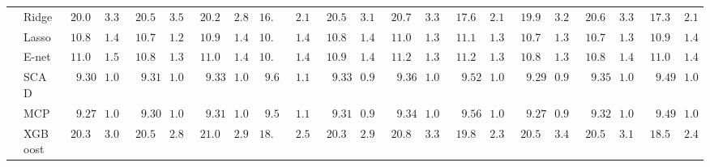 \begin{tabular}{p{0.2cm}p{1cm}|p{0.6cm}p{0.6cm}|p{0.6cm}p{0.6cm}p{0.6cm}p{0.6cm}p{0.6cm}p{0.6cm}|p{0.6cm}p{0.6cm}p{0.6cm}p{0.6cm}p{0.6cm}p{0.6cm}|p{0.6cm}p{0.6cm}p{0.6cm}p{0.6cm}p{0.6cm}p{0.6cm}}
 & Ridge  & $\phantom{0}20.09$ & $\phantom{0}3.38$ & $\phantom{0}20.56$ & $\phantom{0}3.56$ & $\phantom{0}20.27$ & $\phantom{0}2.80$ & $16.79$ & $\phantom{0}2.15$ & $\phantom{0}20.53$ & $\phantom{0}3.12$ & $\phantom{0}20.70$ & $\phantom{0}3.32$ & $\phantom{0}17.67$ & $\phantom{0}2.17$ & $\phantom{0}19.91$ & $\phantom{0}3.20$ & $\phantom{0}20.68$ & $\phantom{0}3.36$ & $\phantom{0}17.35$ & $\phantom{0}2.13$ \\
 & Lasso  & $\phantom{0}10.87$ & $\phantom{0}1.47$ & $\phantom{0}10.70$ & $\phantom{0}1.27$ & $\phantom{0}10.91$ & $\phantom{0}1.43$ & $10.65$ & $\phantom{0}1.41$ & $\phantom{0}10.83$ & $\phantom{0}1.46$ & $\phantom{0}11.05$ & $\phantom{0}1.33$ & $\phantom{0}11.11$ & $\phantom{0}1.35$ & $\phantom{0}10.72$ & $\phantom{0}1.33$ & $\phantom{0}10.73$ & $\phantom{0}1.36$ & $\phantom{0}10.96$ & $\phantom{0}1.47$ \\
 & E-net  & $\phantom{0}11.02$ & $\phantom{0}1.51$ & $\phantom{0}10.83$ & $\phantom{0}1.31$ & $\phantom{0}11.02$ & $\phantom{0}1.41$ & $10.74$ & $\phantom{0}1.42$ & $\phantom{0}10.94$ & $\phantom{0}1.49$ & $\phantom{0}11.20$ & $\phantom{0}1.37$ & $\phantom{0}11.20$ & $\phantom{0}1.34$ & $\phantom{0}10.85$ & $\phantom{0}1.35$ & $\phantom{0}10.84$ & $\phantom{0}1.40$ & $\phantom{0}11.08$ & $\phantom{0}1.48$ \\
 & SCAD  & $\phantom{00}9.30$ & $\phantom{0}1.06$ & $\phantom{00}9.31$ & $\phantom{0}1.02$ & $\phantom{00}9.33$ & $\phantom{0}1.05$ & $\phantom{0}9.60$ & $\phantom{0}1.14$ & $\phantom{00}9.33$ & $\phantom{0}0.97$ & $\phantom{00}9.36$ & $\phantom{0}1.04$ & $\phantom{00}9.52$ & $\phantom{0}1.05$ & $\phantom{00}9.29$ & $\phantom{0}0.99$ & $\phantom{00}9.35$ & $\phantom{0}1.03$ & $\phantom{00}9.49$ & $\phantom{0}1.08$ \\
 & MCP  & $\phantom{00}9.27$ & $\phantom{0}1.05$ & $\phantom{00}9.30$ & $\phantom{0}1.02$ & $\phantom{00}9.31$ & $\phantom{0}1.04$ & $\phantom{0}9.59$ & $\phantom{0}1.13$ & $\phantom{00}9.31$ & $\phantom{0}0.97$ & $\phantom{00}9.34$ & $\phantom{0}1.02$ & $\phantom{00}9.56$ & $\phantom{0}1.07$ & $\phantom{00}9.27$ & $\phantom{0}0.99$ & $\phantom{00}9.32$ & $\phantom{0}1.05$ & $\phantom{00}9.49$ & $\phantom{0}1.08$ \\
 & XGBoost  & $\phantom{0}20.30$ & $\phantom{0}3.04$ & $\phantom{0}20.51$ & $\phantom{0}2.81$ & $\phantom{0}21.01$ & $\phantom{0}2.95$ & $18.51$ & $\phantom{0}2.56$ & $\phantom{0}20.31$ & $\phantom{0}2.91$ & $\phantom{0}20.81$ & $\phantom{0}3.37$ & $\phantom{0}19.81$ & $\phantom{0}2.34$ & $\phantom{0}20.50$ & $\phantom{0}3.49$ & $\phantom{0}20.58$ & $\phantom{0}3.12$ & $\phantom{0}18.56$ & $\phantom{0}2.46$ \\

\end{tabular}
